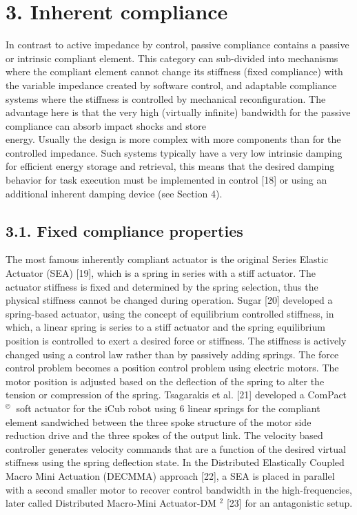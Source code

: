 \documentclass[10pt]{article}
\begin{document}
\section*{3. Inherent compliance}
In contrast to active impedance by control, passive compliance contains a passive or intrinsic compliant element. This category can sub-divided into mechanisms where the compliant element cannot change its stiffness (fixed compliance) with the variable impedance created by software control, and adaptable compliance systems where the stiffness is controlled by mechanical reconfiguration. The advantage here is that the very high (virtually infinite) bandwidth for the passive compliance can absorb impact shocks and store\\[0pt]
energy. Usually the design is more complex with more components than for the controlled impedance. Such systems typically have a very low intrinsic damping for efficient energy storage and retrieval, this means that the desired damping behavior for task execution must be implemented in control [18] or using an additional inherent damping device (see Section 4).

\subsection*{3.1. Fixed compliance properties}
The most famous inherently compliant actuator is the original Series Elastic Actuator (SEA) [19], which is a spring in series with a stiff actuator. The actuator stiffness is fixed and determined by the spring selection, thus the physical stiffness cannot be changed during operation. Sugar [20] developed a spring-based actuator, using the concept of equilibrium controlled stiffness, in which, a linear spring is series to a stiff actuator and the spring equilibrium position is controlled to exert a desired force or stiffness. The stiffness is actively changed using a control law rather than by passively adding springs. The force control problem becomes a position control problem using electric motors. The motor position is adjusted based on the deflection of the spring to alter the tension or compression of the spring. Tsagarakis et al. [21] developed a ComPact ${ }^{\text {© }}$ soft actuator for the iCub robot using 6 linear springs for the compliant element sandwiched between the three spoke structure of the motor side reduction drive and the three spokes of the output link. The velocity based controller generates velocity commands that are a function of the desired virtual stiffness using the spring deflection state. In the Distributed Elastically Coupled Macro Mini Actuation (DECMMA) approach [22], a SEA is placed in parallel with a second smaller motor to recover control bandwidth in the high-frequencies, later called Distributed Macro-Mini Actuator-DM ${ }^{2}$ [23] for an antagonistic setup.
\end{document}
